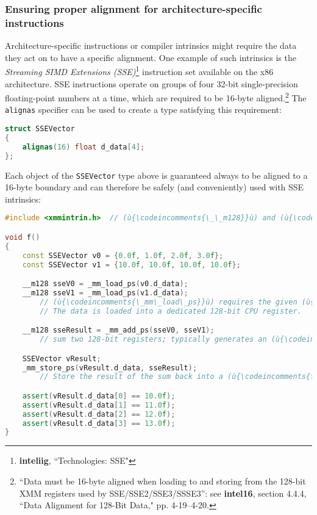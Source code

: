 \subsubsection[Ensuring proper alignment for architecture-specific instructions]{Ensuring proper alignment for architecture-specific instructions}\label{ensuring-proper-alignment-for-architecture-specific-instructions}

Architecture-specific instructions or compiler intrinsics might require
the data they act on to have a specific alignment. One example of such
intrinsics is the \emph{Streaming SIMD Extensions (SSE)}\footnote{\textbf{inteliig}, ``Technologies: SSE"} instruction set available on the x86
architecture. SSE instructions operate on groups of four 32-bit
single-precision floating-point numbers at a time, which are required to
be 16-byte aligned.{\cprotect\footnote{``Data must be
16-byte aligned when loading to and storing from the 128-bit XMM
  registers used by SSE/SSE2/SSE3/SSSE3'': see \textbf{{intel16}},
  section 4.4.4, ``Data Alignment for 128-Bit Data," pp. 4-19--4-20.}} The
\texttt{alignas} specifier can be used to create a type satisfying this requirement:

\begin{lstlisting}[language=C++]
struct SSEVector
{
    alignas(16) float d_data[4];
};
\end{lstlisting}
    
\noindent Each object of the \texttt{SSEVector} type above is guaranteed always to
be aligned to a 16-byte boundary and can therefore be safely (and
conveniently) used with SSE intrinsics:

\begin{lstlisting}[language=C++]
#include <xmmintrin.h>  // (ù{\codeincomments{\_\_m128}}ù) and (ù{\codeincomments{\_mm\_XXX}}ù) functions

void f()
{
    const SSEVector v0 = {0.0f, 1.0f, 2.0f, 3.0f};
    const SSEVector v1 = {10.0f, 10.0f, 10.0f, 10.0f};

    __m128 sseV0 = _mm_load_ps(v0.d_data);
    __m128 sseV1 = _mm_load_ps(v1.d_data);
        // (ù{\codeincomments{\_mm\_load\_ps}}ù) requires the given (ù{\codeincomments{float}}ù) array to be 16-byte aligned.
        // The data is loaded into a dedicated 128-bit CPU register.

    __m128 sseResult = _mm_add_ps(sseV0, sseV1);
        // sum two 128-bit registers; typically generates an (ù{\codeincomments{addps}}ù) instruction

    SSEVector vResult;
    _mm_store_ps(vResult.d_data, sseResult);
        // Store the result of the sum back into a (ù{\codeincomments{float}}ù) array.

    assert(vResult.d_data[0] == 10.0f);
    assert(vResult.d_data[1] == 11.0f);
    assert(vResult.d_data[2] == 12.0f);
    assert(vResult.d_data[3] == 13.0f);
}
\end{lstlisting}
    

